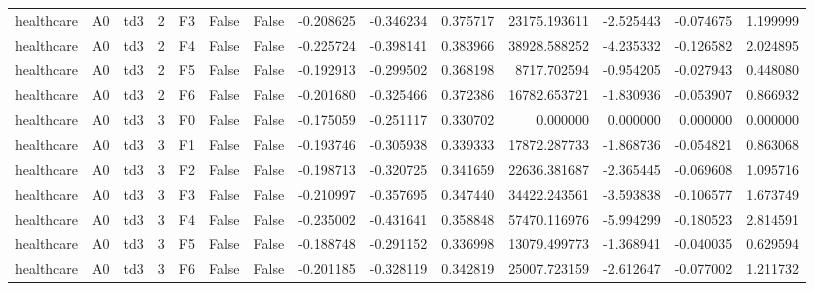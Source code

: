 \begin{tabular}{lllrlllrrrrrrr}
healthcare &      A0 &       td3 &     2 &  F3 &           False &            False & -0.208625 & -0.346234 & 0.375717 &     23175.193611 &          -2.525443 &       -0.074675 &            1.199999 \\
healthcare &      A0 &       td3 &     2 &  F4 &           False &            False & -0.225724 & -0.398141 & 0.383966 &     38928.588252 &          -4.235332 &       -0.126582 &            2.024895 \\
healthcare &      A0 &       td3 &     2 &  F5 &           False &            False & -0.192913 & -0.299502 & 0.368198 &      8717.702594 &          -0.954205 &       -0.027943 &            0.448080 \\
healthcare &      A0 &       td3 &     2 &  F6 &           False &            False & -0.201680 & -0.325466 & 0.372386 &     16782.653721 &          -1.830936 &       -0.053907 &            0.866932 \\
healthcare &      A0 &       td3 &     3 &  F0 &           False &            False & -0.175059 & -0.251117 & 0.330702 &         0.000000 &           0.000000 &        0.000000 &            0.000000 \\
healthcare &      A0 &       td3 &     3 &  F1 &           False &            False & -0.193746 & -0.305938 & 0.339333 &     17872.287733 &          -1.868736 &       -0.054821 &            0.863068 \\
healthcare &      A0 &       td3 &     3 &  F2 &           False &            False & -0.198713 & -0.320725 & 0.341659 &     22636.381687 &          -2.365445 &       -0.069608 &            1.095716 \\
healthcare &      A0 &       td3 &     3 &  F3 &           False &            False & -0.210997 & -0.357695 & 0.347440 &     34422.243561 &          -3.593838 &       -0.106577 &            1.673749 \\
healthcare &      A0 &       td3 &     3 &  F4 &           False &            False & -0.235002 & -0.431641 & 0.358848 &     57470.116976 &          -5.994299 &       -0.180523 &            2.814591 \\
healthcare &      A0 &       td3 &     3 &  F5 &           False &            False & -0.188748 & -0.291152 & 0.336998 &     13079.499773 &          -1.368941 &       -0.040035 &            0.629594 \\
healthcare &      A0 &       td3 &     3 &  F6 &           False &            False & -0.201185 & -0.328119 & 0.342819 &     25007.723159 &          -2.612647 &       -0.077002 &            1.211732 \\

\end{tabular}
